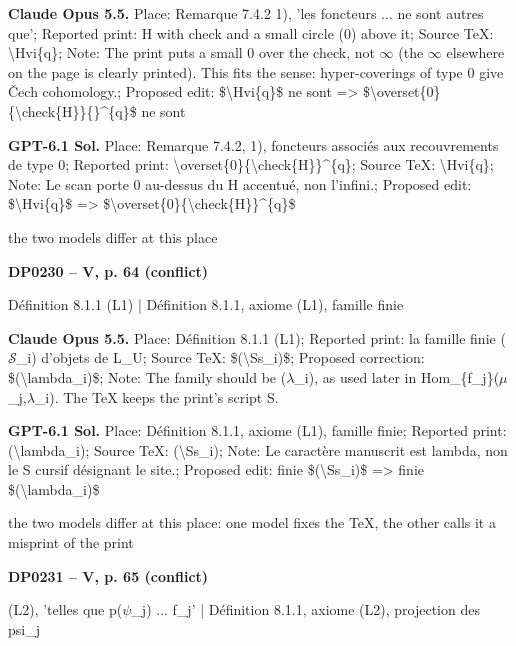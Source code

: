 \textbf{Claude Opus 5.5.} Place: Remarque 7.4.2 1), 'les foncteurs ... ne sont autres que'; Reported print: H with check and a small circle (0) above it; Source TeX: \textbackslash{}Hvi\{q\}; Note: The print puts a small 0 over the check, not \ensuremath{\infty} (the \ensuremath{\infty} elsewhere on the page is clearly printed). This fits the sense: hyper-coverings of type 0 give Čech cohomology.; Proposed edit: \$\textbackslash{}Hvi\{q\}\$ ne sont =\allowbreak > \$\textbackslash{}overset\{0\}\{\textbackslash{}check\{H\}\}\{\}\textasciicircum{}\{q\}\$ ne sont\par
\textbf{GPT-6.1 Sol.} Place: Remarque 7.4.2, 1), foncteurs associés aux recouvrements de type 0; Reported print: \textbackslash{}overset\{0\}\{\textbackslash{}check\{H\}\}\textasciicircum{}\{q\}; Source TeX: \textbackslash{}Hvi\{q\}; Note: Le scan porte 0 au-dessus du H accentué, non l'infini.; Proposed edit: \$\textbackslash{}Hvi\{q\}\$ =\allowbreak > \$\textbackslash{}overset\{0\}\{\textbackslash{}check\{H\}\}\textasciicircum{}\{q\}\$\par
the two models differ at this place\par
\par\noindent\hypertarget{DP0230}{}\textbf{DP0230 -- V, p. 64 (conflict)}\par
Définition 8.1.1 (L1) | Définition 8.1.1, axiome (L1), famille finie\par
\textbf{Claude Opus 5.5.} Place: Définition 8.1.1 (L1); Reported print: la famille finie (\ensuremath{𝒮}\_i) d'objets de L\_U; Source TeX: \$(\textbackslash{}Ss\_i)\$; Proposed correction: \$(\textbackslash{}lambda\_i)\$; Note: The family should be (\ensuremath{\lambda}\_i), as used later in Hom\_\{f\_j\}(\ensuremath{\mu}\_j,\ensuremath{\lambda}\_i). The TeX keeps the print's script S.\par
\textbf{GPT-6.1 Sol.} Place: Définition 8.1.1, axiome (L1), famille finie; Reported print: (\textbackslash{}lambda\_i); Source TeX: (\textbackslash{}Ss\_i); Note: Le caractère manuscrit est lambda, non le S cursif désignant le site.; Proposed edit: finie \$(\textbackslash{}Ss\_i)\$ =\allowbreak > finie \$(\textbackslash{}lambda\_i)\$\par
the two models differ at this place: one model fixes the TeX, the other calls it a misprint of the print\par
\par\noindent\hypertarget{DP0231}{}\textbf{DP0231 -- V, p. 65 (conflict)}\par
(L2), 'telles que p(\ensuremath{\psi}\_j) ... f\_j' | Définition 8.1.1, axiome (L2), projection des psi\_j\par
